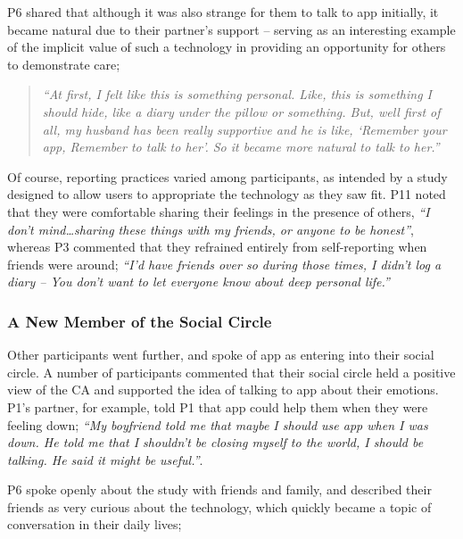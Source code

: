             P6 shared that although it was also strange for them to talk to \acl{app} initially, it became natural due to their partner's support -- serving as an interesting example of the implicit value of such a technology in providing an opportunity for others to demonstrate care;
            
                \begin{quote}
                \vspace{2mm}
                    \textit{``At first, I felt like this is something personal. Like, this is something I should hide, like a diary under the pillow or something. But, well first of all, my husband has been really supportive and he is like, `Remember your \acl{app}, Remember to talk to her'. So it became more natural to talk to her.''} %
                \vspace{2mm}
                \end{quote} 
            
            Of course, reporting practices varied among participants, as intended by a study designed to allow users to appropriate the technology as they saw fit. P11 noted that they were comfortable sharing their feelings in the presence of others, \textit{``I don't mind\ldots sharing these things with my friends, or anyone to be honest''}, whereas P3 commented that they refrained entirely from self-reporting when friends were around; \textit{``I’d have friends over so during those times, I didn’t log a diary -- You don’t want to let everyone know about deep personal life.''}
  
        \subsubsection{A New Member of the Social Circle} %
        
            Other participants went further, and spoke of \acl{app} as entering into their social circle. A number of participants commented that their social circle held a positive view of the \ac{CA} and supported the idea of talking to \acl{app} about their emotions. P1's partner, for example, told P1 that \ac{app} could help them when they were feeling down; \textit{``My boyfriend told me that maybe I should use \acl{app} when I was down. He told me that I shouldn’t be closing myself to the world, I should be talking. He said it might be useful.''}. 
            
            P6 spoke openly about the study with friends and family, and described their friends as very curious about the technology, which quickly became a topic of conversation in their daily lives;
            
